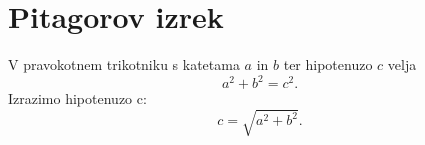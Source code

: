 \documentclass{article}
\begin{document}
\section*{Pitagorov izrek}
V pravokotnem trikotniku s katetama \(a\) in \(b\) ter hipotenuzo \(c\) velja
\[ a^2 + b^2 = c^2 .\]
Izrazimo hipotenuzo c:
\[ c = \sqrt{a^2 + b^2} .\]
\end{document}
